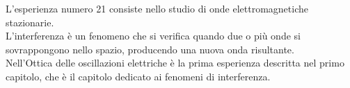 L'esperienza numero 21 consiste nello studio di onde elettromagnetiche stazionarie.\\
L'interferenza è un fenomeno che si verifica quando due o più onde si sovrappongono nello spazio, producendo una nuova onda risultante.\\ 
Nell'Ottica delle oscillazioni elettriche \cite{righi1897ottica} è la prima esperienza descritta nel primo capitolo, che è il capitolo
dedicato ai fenomeni di interferenza.\\

